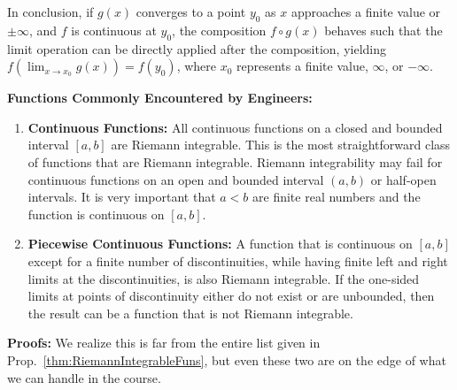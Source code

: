 In conclusion, if $g(x)$ converges to a point $y_0$ as $x$ approaches a finite value or $\pm \infty$, and $f$ is continuous at $y_0$, the composition $f \circ g(x)$ behaves such that the limit operation can be directly applied after the composition, yielding $f(\lim_{x \to x_0} g(x)) = f(y_0)$, where $x_0$ represents a finite value, $\infty$, or $-\infty$.

\Qed

\bigskip

 \begin{tcolorbox}[title= \textcolor{black}{Proof of Prop.~\ref{thm:RiemannIntegrableFuns} (Handy List of Functions Having a Riemann Integral)}, sharp corners, colback=green!30, colframe=green!80!blue, breakable, fonttitle=\bfseries]


\textbf{Functions Commonly Encountered by Engineers:}
\begin{enumerate}
\renewcommand{\labelenumi}{(\alph{enumi})}
    \setlength{\itemsep}{.2cm}
    \item \textbf{Continuous Functions: } All continuous functions on a closed and bounded interval $[a, b]$ are Riemann integrable. This is the most straightforward class of functions that are Riemann integrable. Riemann integrability may fail for continuous functions on an open and bounded interval $(a, b)$ or half-open intervals. It is very important that $a < b$ are finite real numbers and the function is continuous on $[a, b]$.  
    
    \item \textbf{Piecewise Continuous Functions: } A function that is continuous on $[a, b]$ except for a finite number of discontinuities, while having finite left and right limits at the discontinuities, is also Riemann integrable. If the one-sided limits at points of discontinuity either do not exist or are unbounded, then the result can be a function that is not Riemann integrable. 
\end{enumerate}
\end{tcolorbox}

\bigskip

\textbf{Proofs:} We realize this is far from the entire list given in Prop.~\ref{thm:RiemannIntegrableFuns}, but even these two are on the edge of what we can handle in the course.\\

